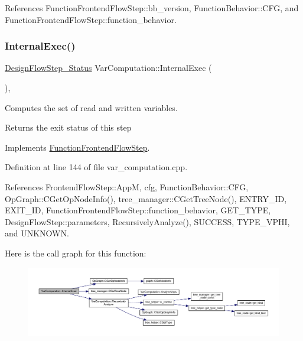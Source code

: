 References Function\+Frontend\+Flow\+Step\+::bb\+\_\+version, Function\+Behavior\+::\+C\+FG, and Function\+Frontend\+Flow\+Step\+::function\+\_\+behavior.

\mbox{\label{classVarComputation_a8c4cd153c99d3a411b69e9574f0c6447}} 
\subsubsection{\texorpdfstring{Internal\+Exec()}{InternalExec()}}
{\footnotesize\ttfamily \hyperlink{design__flow__step_8hpp_afb1f0d73069c26076b8d31dbc8ebecdf}{Design\+Flow\+Step\+\_\+\+Status} Var\+Computation\+::\+Internal\+Exec (\begin{DoxyParamCaption}{ }\end{DoxyParamCaption})\hspace{0.3cm}{\ttfamily [override]}, {\ttfamily [virtual]}}



Computes the set of read and written variables. 

\begin{DoxyReturn}{Returns}
the exit status of this step 
\end{DoxyReturn}


Implements \hyperlink{classFunctionFrontendFlowStep_a00612f7fb9eabbbc8ee7e39d34e5ac68}{Function\+Frontend\+Flow\+Step}.



Definition at line 144 of file var\+\_\+computation.\+cpp.



References Frontend\+Flow\+Step\+::\+AppM, cfg, Function\+Behavior\+::\+C\+FG, Op\+Graph\+::\+C\+Get\+Op\+Node\+Info(), tree\+\_\+manager\+::\+C\+Get\+Tree\+Node(), E\+N\+T\+R\+Y\+\_\+\+ID, E\+X\+I\+T\+\_\+\+ID, Function\+Frontend\+Flow\+Step\+::function\+\_\+behavior, G\+E\+T\+\_\+\+T\+Y\+PE, Design\+Flow\+Step\+::parameters, Recursively\+Analyze(), S\+U\+C\+C\+E\+SS, T\+Y\+P\+E\+\_\+\+V\+P\+HI, and U\+N\+K\+N\+O\+WN.

Here is the call graph for this function\+:
\nopagebreak
\begin{figure}[H]
\begin{center}
\leavevmode
\includegraphics[width=350pt]{dd/d82/classVarComputation_a8c4cd153c99d3a411b69e9574f0c6447_cgraph}
\end{center}
\end{figure}
\mbox{\label{classVarComputation_adbf3ccb08fa07a97200ab564774c9518}} 
